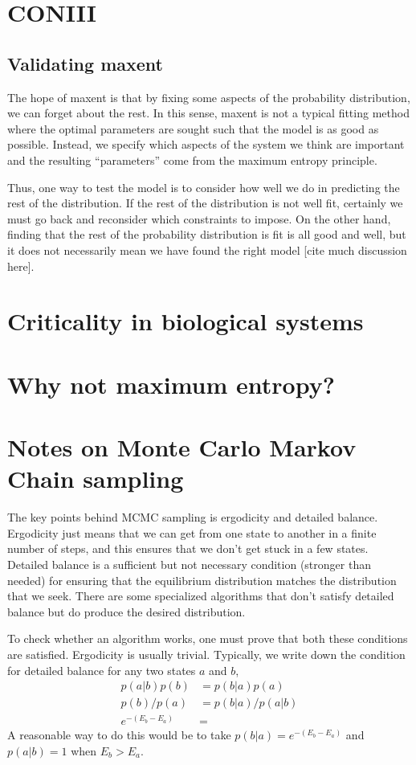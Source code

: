 \documentclass[11pt]{amsart}
\begin{document}
\section{CONIII}

\subsection{Validating maxent}
The hope of maxent is that by fixing some aspects of the probability distribution, we can forget about the rest. In this sense, maxent is not a typical fitting method where the optimal parameters are sought such that the model is as good as possible. Instead, we specify which aspects of the system we think are important and the resulting ``parameters'' come from the maximum entropy principle.

Thus, one way to test the model is to consider how well we do in predicting the rest of the distribution. If the rest of the distribution is not well fit, certainly we must go back and reconsider which constraints to impose. On the other hand, finding that the rest of the probability distribution is fit is all good and well, but it does not necessarily mean we have found the right model [cite much discussion here].

\section{Criticality in biological systems}

\section{Why not maximum entropy?}

\section{Notes on Monte Carlo Markov Chain sampling}
The key points behind MCMC sampling is ergodicity and detailed balance. Ergodicity just means that we can get from one state to another in a finite number of steps, and this ensures that we don't get stuck in a few states. Detailed balance is a sufficient but not necessary condition (stronger than needed) for ensuring that the equilibrium distribution matches the distribution that we seek. There are some specialized algorithms that don't satisfy detailed balance but do produce the desired distribution.

To check whether an algorithm works, one must prove that both these conditions are satisfied. Ergodicity is usually trivial. Typically, we write down the condition for detailed balance for any two states $a$ and $b$,
\begin{align}
	p(a|b)p(b) &= p(b|a)p(a) \\
	p(b)/p(a) &= p(b|a)/p(a|b) \\
	e^{-(E_b-E_a)} &= 
\end{align}
A reasonable way to do this would be to take $p(b|a) = e^{-(E_b-E_a)}$ and $p(a|b) = 1$ when $E_b>E_a$.
\end{document}
